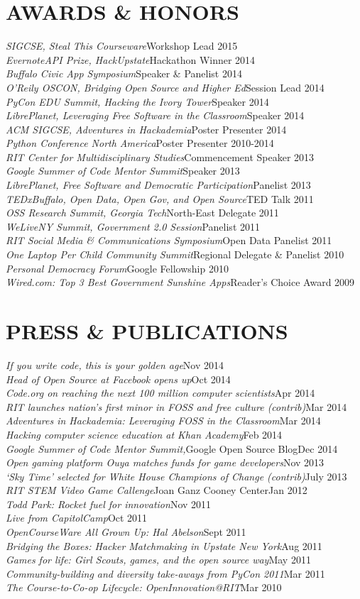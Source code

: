 \documentclass[margin]{res}
\newcommand{\event}[2]{{\it #1}\hfill #2\\}
\newcommand{\publication}[3]{{\it #1}#2\hfill #3\\}
\begin{document}
\begin{resume}
\section{AWARDS \& HONORS}
    \event{SIGCSE, Steal This Courseware}{Workshop Lead 2015}
    \event{EvernoteAPI Prize, HackUpstate}{Hackathon Winner 2014}
    \event{Buffalo Civic App Symposium}{Speaker \& Panelist 2014}
    \event{O'Reily OSCON, Bridging Open Source and Higher Ed}{Session Lead 2014}
    \event{PyCon EDU Summit, Hacking the Ivory Tower}{Speaker 2014}
    \event{LibrePlanet, Leveraging Free Software in the Classroom}{Speaker 2014}
    \event{ACM SIGCSE, Adventures in Hackademia}{Poster Presenter 2014}
    \event{Python Conference North America}{Poster Presenter 2010-2014}
    \event{RIT Center for Multidisciplinary Studies}{Commencement Speaker 2013}
    \event{Google Summer of Code Mentor Summit}{Speaker 2013}
    \event{LibrePlanet, Free Software and Democratic Participation}{Panelist 2013}
    \event{TEDxBuffalo, Open Data, Open Gov, and Open Source}{TED Talk 2011}
    \event{OSS Research Summit, Georgia Tech}{North-East Delegate 2011}
    \event{WeLiveNY Summit, Government 2.0 Session}{Panelist 2011}
    \event{RIT Social Media \& Communications Symposium}{Open Data Panelist 2011}
    \event{One Laptop Per Child Community Summit}{Regional Delegate \& Panelist 2010}
    \event{Personal Democracy Forum}{Google Fellowship 2010}
    \event{Wired.com: Top 3 Best Government Sunshine Apps}{Reader's Choice Award 2009}

\pagebreak

\section{PRESS \& PUBLICATIONS}
    \publication{If you write code, this is your golden age}{}{Nov 2014}
    \publication{Head of Open Source at Facebook opens up}{}{Oct 2014}
    \publication{Code.org on reaching the next 100 million computer scientists}{}{Apr 2014}
    \publication{RIT launches nation's first minor in FOSS and free culture (contrib)}{}{Mar 2014}
    \publication{Adventures in Hackademia: Leveraging FOSS in the Classroom}{}{Mar 2014}
    \publication{Hacking computer science education at Khan Academy}{}{Feb 2014}
    \publication{Google Summer of Code Mentor Summit,}{Google Open Source Blog}{Dec 2014}
    \publication{Open gaming platform Ouya matches funds for game developers}{}{Nov 2013}
    \publication{`Sky Time' selected for White House Champions of Change (contrib)}{}{July 2013}
    \publication{RIT STEM Video Game Callenge}{Joan Ganz Cooney Center}{Jan 2012}
    \publication{Todd Park: Rocket fuel for innovation}{}{Nov 2011}
    \publication{Live from CapitolCamp}{}{Oct 2011}
    \publication{OpenCourseWare All Grown Up: Hal Abelson}{}{Sept 2011}
    \publication{Bridging the Boxes: Hacker Matchmaking in Upstate New York}{}{Aug 2011}
    \publication{Games for life: Girl Scouts, games, and the open source way}{}{May 2011}
    \publication{Community-building and diversity take-aways from PyCon 2011}{}{Mar 2011}
    \publication{The Course-to-Co-op Lifecycle: OpenInnovation@RIT}{}{Mar 2010}



\end{resume}
\end{document}
